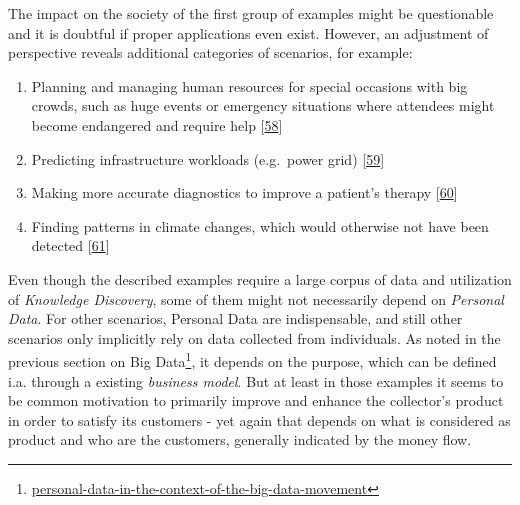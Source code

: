 \documentclass[12pt,english,a4paper,titlepage,cleardoublepage=empty,dottedtoc]{report}
\renewcommand{\href}[2]{#2\footnote{\url{#1}}}
\begin{document}
The impact on the society of the first group of examples might be
questionable and it is doubtful if proper applications even exist.
However, an adjustment of perspective reveals additional categories of
scenarios, for example:

\begin{enumerate}
\def\labelenumi{\Alph{enumi})}
\setcounter{enumi}{3}
\item
  Planning and managing human resources for special occasions with big
  crowds, such as huge events or emergency situations where attendees
  might become endangered and require help
  {[}\protect\hyperlink{ref-estimating-the-locations-of-emergency-events-from-twitter-streams_2014}{58}{]}
\item
  Predicting infrastructure workloads (e.g.~power grid)
  {[}\protect\hyperlink{ref-paper_2015_improving-power-grid-monitoring-data-quality-an-efficient-machine-learning-framework-for-missing-data-prediction}{59}{]}
\item
  Making more accurate diagnostics to improve a patient's therapy
  {[}\protect\hyperlink{ref-the-practice-of-predictive-analytics-in-healthcare_2013}{60}{]}
\item
  Finding patterns in climate changes, which would otherwise not have
  been detected
  {[}\protect\hyperlink{ref-data-collection-for-climate-changes_2014}{61}{]}
\end{enumerate}

Even though the described examples require a large corpus of data and
utilization of \emph{Knowledge Discovery}, some of them might not
necessarily depend on \emph{Personal Data}. For other scenarios,
Personal Data are indispensable, and still other scenarios only
implicitly rely on data collected from individuals. As noted in the
\href{personal-data-in-the-context-of-the-big-data-movement}{previous
section on Big Data}, it depends on the purpose, which can be defined
i.a. through a existing \emph{business model}. But at least in those
examples it seems to be common motivation to primarily improve and
enhance the collector's product in order to satisfy its customers - yet
again that depends on what is considered as product and who are the
customers, generally indicated by the money flow.
\end{document}
